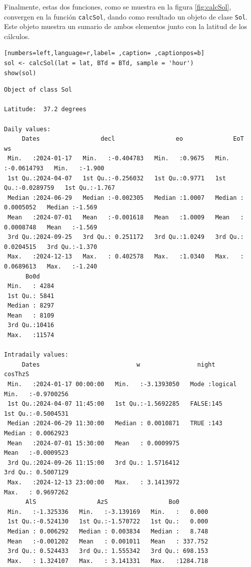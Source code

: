 Finalmente, estas dos funciones, como se muestra en la figura \ref{fig:calcSol}, convergen en la función \texttt{calcSol}, dando como resultado un objeto de clase \texttt{Sol}. Este objeto muestra un sumario de ambos elementos junto con la latitud de los cálculos.
\begin{lstlisting}[numbers=left,language=r,label= ,caption= ,captionpos=b]
sol <- calcSol(lat = lat, BTd = BTd, sample = 'hour')
show(sol)
\end{lstlisting}

\begin{verbatim}
Object of class Sol 

Latitude:  37.2 degrees

Daily values:
     Dates                 decl                 eo              EoT                   ws        
 Min.   :2024-01-17   Min.   :-0.404783   Min.   :0.9675   Min.   :-0.0614793   Min.   :-1.900  
 1st Qu.:2024-04-07   1st Qu.:-0.256032   1st Qu.:0.9771   1st Qu.:-0.0289759   1st Qu.:-1.767  
 Median :2024-06-29   Median :-0.002305   Median :1.0007   Median : 0.0005052   Median :-1.569  
 Mean   :2024-07-01   Mean   :-0.001618   Mean   :1.0009   Mean   : 0.0008748   Mean   :-1.569  
 3rd Qu.:2024-09-25   3rd Qu.: 0.251172   3rd Qu.:1.0249   3rd Qu.: 0.0204515   3rd Qu.:-1.370  
 Max.   :2024-12-13   Max.   : 0.402578   Max.   :1.0340   Max.   : 0.0689613   Max.   :-1.240  
      Bo0d      
 Min.   : 4284  
 1st Qu.: 5841  
 Median : 8297  
 Mean   : 8109  
 3rd Qu.:10416  
 Max.   :11574  

Intradaily values: 
     Dates                           w                night            cosThzS          
 Min.   :2024-01-17 00:00:00   Min.   :-3.1393050   Mode :logical   Min.   :-0.9700256  
 1st Qu.:2024-04-07 11:45:00   1st Qu.:-1.5692285   FALSE:145       1st Qu.:-0.5004531  
 Median :2024-06-29 11:30:00   Median : 0.0010871   TRUE :143       Median : 0.0062923  
 Mean   :2024-07-01 15:30:00   Mean   : 0.0009975                   Mean   :-0.0009523  
 3rd Qu.:2024-09-26 11:15:00   3rd Qu.: 1.5716412                   3rd Qu.: 0.5007129  
 Max.   :2024-12-13 23:00:00   Max.   : 3.1413972                   Max.   : 0.9697262  
      AlS                 AzS                 Bo0          
 Min.   :-1.325336   Min.   :-3.139169   Min.   :   0.000  
 1st Qu.:-0.524130   1st Qu.:-1.570722   1st Qu.:   0.000  
 Median : 0.006292   Median : 0.003834   Median :   8.748  
 Mean   :-0.001202   Mean   : 0.001011   Mean   : 337.752  
 3rd Qu.: 0.524433   3rd Qu.: 1.555342   3rd Qu.: 698.153  
 Max.   : 1.324107   Max.   : 3.141331   Max.   :1284.718
\end{verbatim}

